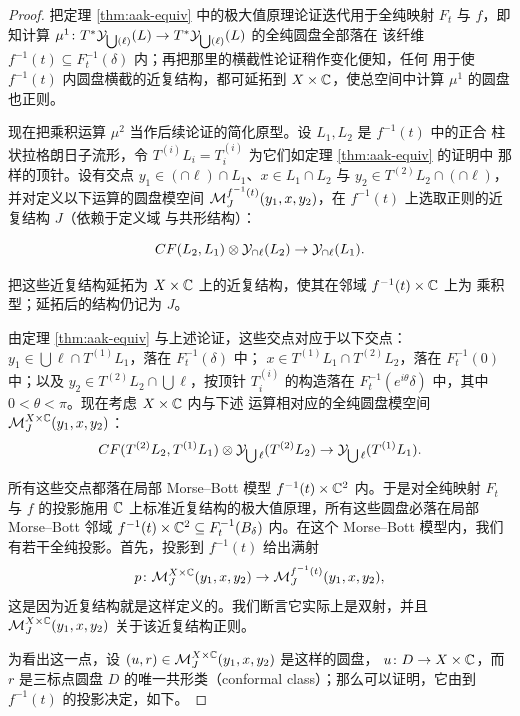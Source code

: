 \begin{proof}
把定理 \ref{thm:aak-equiv} 中的极大值原理论证迭代用于全纯映射 $F_t$ 与 $f$，即知计算
$\mu^1\colon T^*\mathcal{Y}_{\bigcup(\ell)}(L)\to T^*\mathcal{Y}_{\bigcup(\ell)}(L)$ 的全纯圆盘全部落在
该纤维 $f^{-1}(t)\subseteq F_t^{-1}(\delta)$ 内；再把那里的横截性论证稍作变化便知，任何
用于使 $f^{-1}(t)$ 内圆盘横截的近复结构，都可延拓到 $X\times\mathbb{C}$，使总空间中计算 $\mu^1$
的圆盘也正则。


现在把乘积运算 $\mu^2$ 当作后续论证的简化原型。设 $L_1,L_2$ 是 $f^{-1}(t)$ 中的正合
柱状拉格朗日子流形，令 $T^{(i)}L_i=T_i^{(i)}$ 为它们如定理 \ref{thm:aak-equiv} 的证明中
那样的顶针。设有交点 $y_1\in(\cap\ell)\cap L_1$、$x\in L_1\cap L_2$ 与
$y_2\in T^{(2)}L_2\cap(\cap\ell)$，并对定义以下运算的圆盘模空间
$\mathcal{M}_J^{f^{-1}(t)}(y_1,x,y_2)$，在 $f^{-1}(t)$ 上选取正则的近复结构 $J$（依赖于定义域
与共形结构）：

\[
CF(L_2,L_1)\otimes\mathcal{Y}_{\cap\ell}(L_2)\to\mathcal{Y}_{\cap\ell}(L_1).
\]

把这些近复结构延拓为 $X\times\mathbb{C}$ 上的近复结构，使其在邻域 $f^{-1}(t)\times\mathbb{C}$ 上为
乘积型；延拓后的结构仍记为 $J$。

由定理 \ref{thm:aak-equiv} 与上述论证，这些交点对应于以下交点：
$y_1\in\bigcup\ell\cap T^{(1)}L_1$，落在 $F_t^{-1}(\delta)$ 中；
$x\in T^{(1)}L_1\cap T^{(2)}L_2$，落在 $F_t^{-1}(0)$ 中；以及
$y_2\in T^{(2)}L_2\cap\bigcup\ell$，按顶针 $T_i^{(i)}$ 的构造落在
$F_t^{-1}(e^{i\theta}\delta)$ 中，其中 $0<\theta<\pi$。现在考虑 $X\times\mathbb{C}$ 内与下述
运算相对应的全纯圆盘模空间 $\mathcal{M}_J^{X\times\mathbb{C}}(y_1,x,y_2)$：
\[
CF(T^{(2)}L_2,T^{(1)}L_1)\otimes\mathcal{Y}_{\bigcup\ell}(T^{(2)}L_2)
\to\mathcal{Y}_{\bigcup\ell}(T^{(1)}L_1).
\]

所有这些交点都落在局部 Morse--Bott 模型 $f^{-1}(t)\times\mathbb{C}^2$ 内。于是对全纯映射
$F_t$ 与 $f$ 的投影施用 $\mathbb{C}$ 上标准近复结构的极大值原理，所有这些圆盘必落在局部
Morse--Bott 邻域 $f^{-1}(t)\times\mathbb{C}^2\subseteq F_t^{-1}(B_\delta)$ 内。在这个
Morse--Bott 模型内，我们有若干全纯投影。首先，投影到 $f^{-1}(t)$ 给出满射
\[
p\colon\mathcal{M}_J^{X\times\mathbb{C}}(y_1,x,y_2)\to\mathcal{M}_J^{f^{-1}(t)}(y_1,x,y_2),
\]
这是因为近复结构就是这样定义的。我们断言它实际上是双射，并且
$\mathcal{M}_J^{X\times\mathbb{C}}(y_1,x,y_2)$ 关于该近复结构正则。

为看出这一点，设 $(u,r)\in\mathcal{M}_J^{X\times\mathbb{C}}(y_1,x,y_2)$ 是这样的圆盘，
$u\colon D\to X\times\mathbb{C}$，而 $r$ 是三标点圆盘 $D$ 的唯一共形类（conformal class）；那么可以证明，它由到
$f^{-1}(t)$ 的投影决定，如下。


\end{proof}
